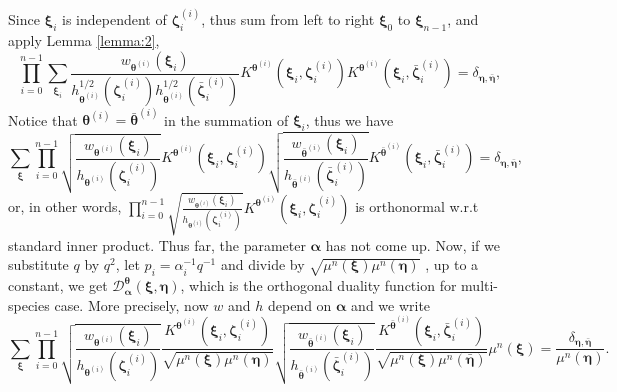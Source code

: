 \documentclass{ximera}
\begin{document}
Since $\boldsymbol\xi_i$ is independent of $\boldsymbol\zeta^{(i)}_i$, thus sum from left to right $\boldsymbol\xi_0$ to $\boldsymbol\xi_{n-1}$, and  apply Lemma \ref{lemma:2},
\begin{equation*}
   \prod_{i=0}^{n-1} \sum_{\boldsymbol\xi_i}\frac{w_{\boldsymbol\theta^{(i)}}(\boldsymbol\xi_i)}{h^{1/2}_{\boldsymbol\theta^{(i)}}(\boldsymbol\zeta^{(i)}_i)h^{1/2}_{\boldsymbol\theta^{(i)}}(\bar{\boldsymbol\zeta}^{(i)}_i)} K^{\boldsymbol\theta^{(i)}}(\boldsymbol\xi_i, \boldsymbol\zeta^{(i)}_i)K^{\boldsymbol\theta^{(i)}}(\boldsymbol\xi_i, \bar{\boldsymbol\zeta}^{(i)}_i)=\delta_{\boldsymbol\eta,\bar{\boldsymbol\eta}},
\end{equation*}
Notice that  $\boldsymbol\theta^{(i)}=\bar{\boldsymbol\theta}^{(i)}$ in the summation of $\boldsymbol\xi_{i}$, thus we have 
\begin{equation*}
   \sum_{\boldsymbol\xi} \prod_{i=0}^{n-1}\sqrt{\frac{w_{\boldsymbol\theta^{(i)}}(\boldsymbol\xi_i)}{h_{\boldsymbol\theta^{(i)}}(\boldsymbol\zeta^{(i)}_i)}}K^{\boldsymbol\theta^{(i)}}(\boldsymbol\xi_i, \boldsymbol\zeta^{(i)}_i)\sqrt{\frac{w_{\bar{\boldsymbol\theta}^{(i)}}(\boldsymbol\xi_i)}{h_{\bar{\boldsymbol\theta}^{(i)}}(\bar{\boldsymbol\zeta}^{(i)}_i)}}K^{\bar{\boldsymbol\theta}^{(i)}}(\boldsymbol\xi_i, \bar{\boldsymbol\zeta}^{(i)}_i)=\delta_{\boldsymbol\eta,\bar{\boldsymbol\eta}},
\end{equation*}
or, in other words, $\prod_{i=0}^{n-1}\sqrt{\frac{w_{\boldsymbol\theta^{(i)}}(\boldsymbol\xi_i)}{h_{\boldsymbol\theta^{(i)}}(\boldsymbol\zeta^{(i)}_i)}}K^{\boldsymbol\theta^{(i)}}(\boldsymbol\xi_i, \boldsymbol\zeta^{(i)}_i) $ is orthonormal w.r.t standard inner product. \newline
Thus far, the parameter $\boldsymbol\alpha$ has not come up. Now, if we substitute  $q$ by $q^2$, let $p_i=\alpha_i^{-1}q^{-1}$ and divide by $\sqrt{\mu^{n}(\boldsymbol\xi) \mu^{n}(\boldsymbol\eta)}$ , up to a constant, we get  $\mathcal{D}^{\boldsymbol\theta}_{\boldsymbol{\alpha}}(\boldsymbol\xi, \boldsymbol\eta)$, which is the orthogonal duality function for multi-species case.  More precisely, now $w$ and $h$ depend on $\boldsymbol\alpha$ and we write
\begin{equation}
   \sum_{\boldsymbol\xi} \prod_{i=0}^{n-1}\sqrt{\frac{w_{\boldsymbol\theta^{(i)}}(\boldsymbol\xi_i)}{h_{\boldsymbol\theta^{(i)}}(\boldsymbol\zeta^{(i)}_i)}}  \frac{K^{\boldsymbol\theta^{(i)}}(\boldsymbol\xi_i, \boldsymbol\zeta^{(i)}_i)}{\sqrt{\mu^n(\boldsymbol\xi)\mu^n(\boldsymbol\eta)}} \sqrt{\frac{w_{\bar{\boldsymbol\theta}^{(i)}}(\boldsymbol\xi_i)}{h_{\bar{\boldsymbol\theta}^{(i)}}(\bar{\boldsymbol\zeta}^{(i)}_i)}} \frac{K^{\bar{\boldsymbol\theta}^{(i)}}(\boldsymbol\xi_i, \bar{\boldsymbol\zeta}^{(i)}_i)}{\sqrt{\mu^n(\boldsymbol\xi)\mu^n(\bar{\boldsymbol\eta})}} \mu^n(\boldsymbol\xi) = \frac{\delta_{\boldsymbol\eta,\bar{\boldsymbol\eta}}}{\mu^n(\boldsymbol\eta)}.
\end{equation}
\end{document}
